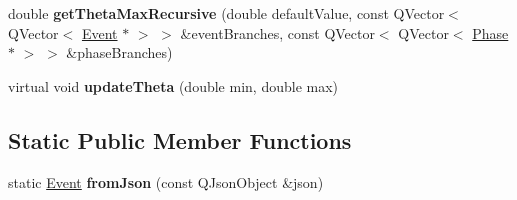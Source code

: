 \begin{DoxyCompactItemize}
\item 
\hypertarget{class_event_afc3f4d0620339eb93ba22abf37086a9f}{double {\bfseries get\-Theta\-Max\-Recursive} (double default\-Value, const Q\-Vector$<$ Q\-Vector$<$ \hyperlink{class_event}{Event} $\ast$ $>$ $>$ \&event\-Branches, const Q\-Vector$<$ Q\-Vector$<$ \hyperlink{class_phase}{Phase} $\ast$ $>$ $>$ \&phase\-Branches)}\label{class_event_afc3f4d0620339eb93ba22abf37086a9f}

\item 
\hypertarget{class_event_a11afd127e812dfb297d4bdbe3e9ab2d9}{virtual void {\bfseries update\-Theta} (double min, double max)}\label{class_event_a11afd127e812dfb297d4bdbe3e9ab2d9}

\end{DoxyCompactItemize}
\subsection*{Static Public Member Functions}
\begin{DoxyCompactItemize}
\item 
\hypertarget{class_event_aaf5b86b4fc720716defeb4f003a40636}{static \hyperlink{class_event}{Event} {\bfseries from\-Json} (const Q\-Json\-Object \&json)}\label{class_event_aaf5b86b4fc720716defeb4f003a40636}

\end{DoxyCompactItemize}

